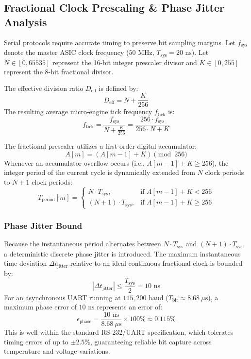 \documentclass[11pt,a4paper]{article}
\begin{document}
\subsection{Fractional Clock Prescaling \& Phase Jitter Analysis}
Serial protocols require accurate timing to preserve bit sampling margins. Let $f_{\text{sys}}$ denote the master ASIC clock frequency ($50\text{ MHz}$, $T_{\text{sys}} = 20\text{ ns}$). Let $N \in [0, 65535]$ represent the 16-bit integer prescaler divisor and $K \in [0, 255]$ represent the 8-bit fractional divisor.

The effective division ratio $D_{\text{eff}}$ is defined by:
\begin{equation}
    D_{\text{eff}} = N + \frac{K}{256}
\end{equation}
The resulting average micro-engine tick frequency $f_{\text{tick}}$ is:
\begin{equation}
    f_{\text{tick}} = \frac{f_{\text{sys}}}{N + \frac{K}{256}} = \frac{256 \cdot f_{\text{sys}}}{256 \cdot N + K}
\end{equation}

The fractional prescaler utilizes a first-order digital accumulator:
\begin{equation}
    A[m] = \left( A[m-1] + K \right) \pmod{256}
\end{equation}
Whenever an accumulator overflow occurs (i.e., $A[m-1] + K \ge 256$), the integer period of the current cycle is dynamically extended from $N$ clock periods to $N + 1$ clock periods:
\begin{equation}
    T_{\text{period}}[m] = 
    \begin{cases} 
        N \cdot T_{\text{sys}}, & \text{if } A[m-1] + K < 256 \\
        (N + 1) \cdot T_{\text{sys}}, & \text{if } A[m-1] + K \ge 256 
    \end{cases}
\end{equation}

\subsubsection{Phase Jitter Bound}
Because the instantaneous period alternates between $N \cdot T_{\text{sys}}$ and $(N+1) \cdot T_{\text{sys}}$, a deterministic discrete phase jitter is introduced. The maximum instantaneous time deviation $\Delta t_{\text{jitter}}$ relative to an ideal continuous fractional clock is bounded by:
\begin{equation}
    |\Delta t_{\text{jitter}}| \le \frac{T_{\text{sys}}}{2} = 10\text{ ns}
\end{equation}
For an asynchronous UART running at $115{,}200\text{ baud}$ ($T_{\text{bit}} \approx 8.68\ \mu\text{s}$), a maximum phase error of $10\text{ ns}$ represents an error of:
\begin{equation}
    \epsilon_{\text{phase}} = \frac{10\text{ ns}}{8.68\ \mu\text{s}} \times 100\% \approx 0.115\%
\end{equation}
This is well within the standard RS-232/UART specification, which tolerates timing errors of up to $\pm 2.5\%$, guaranteeing reliable bit capture across temperature and voltage variations.
\end{document}
